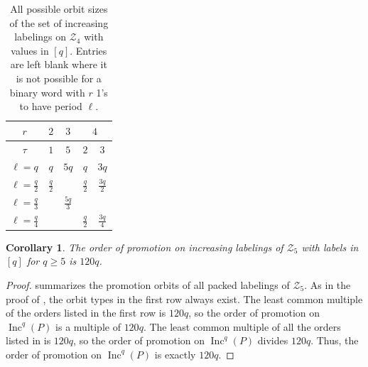 \documentclass[11pt]{amsart}
\newtheorem{corollary}[theorem]{Corollary}
\theoremstyle{definition}
\DeclareMathOperator{\Inc}{\mathrm{Inc}}
\newcommand{\calZ}{\mathcal{Z}}
\begin{document}
\begin{table}[htbp]
    \centering
    \renewcommand{\arraystretch}{1.5}
    \setlength{\tabcolsep}{10pt}
    \begin{tabular}{|c||c|c|c|c|}\hline
       $r$  & $2$ & $ 3$ & \multicolumn{2}{c|}{$4$}\\\hline
   $\tau$ & $1$ & $5$ & $2$ & $3$\\\hline\hline
$\ell = q$ & $q$ & $5q$ & $q$ & $3q$\\\hline
$\ell = \frac{q}{2}$ & $\frac{q}{2}$& & $\frac{q}{2}$ & $\frac{3q}{2}$\\\hline
$\ell = \frac{q}{3}$ & & $\frac{5q}{3}$ & & \\\hline
$\ell = \frac{q}{4}$ &  & & $\frac{q}{2}$ & $\frac{3q}{4}$\\\hline
    \end{tabular}
    \caption{All possible orbit sizes of the set of increasing labelings on $\calZ_4$ with values in $[q]$. Entries are left blank where it is not possible for a binary word with $r$ 1's to have period $\ell$.}
    \label{tab:Z4Orbits}
\end{table}



\begin{corollary}\label{thm:linear-Z5}
The order of promotion on increasing labelings of $\calZ_5$ with labels in $[q]$ for $q \geq 5$ is $120q$.
\end{corollary}

\begin{proof}
 summarizes the promotion orbits of all packed labelings of $\calZ_5$. As in the proof of , the orbit types in the first row always exist.  The least common multiple of the orders listed in the first row is $120q$, so the order of promotion on $\Inc^q(P)$ is a multiple of $120q$. The least common multiple of all the orders listed in  is $120q$, so the order of promotion on $\Inc^q(P)$ divides $120q$. Thus, the order of promotion on $\Inc^q(P)$ is exactly $120q$.
\end{proof}
\end{document}

